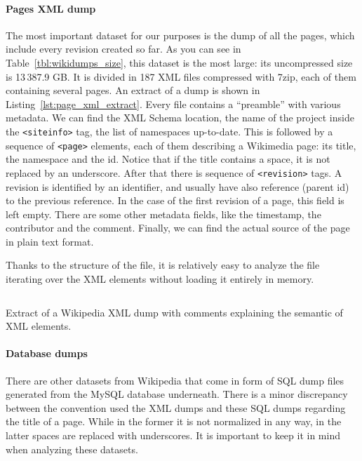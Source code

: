 \paragraph{Pages XML dump}
The most important dataset for our purposes is the dump of all the pages, which include every revision created so far.
As you can see in Table~\ref{tbl:wikidumps_size}, this dataset is the most large: its uncompressed size is 13\,387.9 GB\@.
It is divided in 187 XML files compressed with 7zip, each of them containing several pages.
An extract of a dump is shown in Listing~\ref{lst:page_xml_extract}.
Every file contains a ``preamble'' with various metadata.
We can find the XML Schema location, the name of the project inside the \texttt{<siteinfo>} tag, the list of namespaces up-to-date.
This is followed by a sequence of \texttt{<page>} elements, each of them describing a Wikimedia page: its title, the namespace and the id.
Notice that if the title contains a space, it is not replaced by an underscore.
After that there is sequence of \texttt{<revision>} tags.
A revision is identified by an identifier, and usually have also reference (parent id) to the previous reference.
In the case of the first revision of a page, this field is left empty.
There are some other metadata fields, like the timestamp, the contributor and the comment.
Finally, we can find the actual source of the page in plain text format.

Thanks to the structure of the file, it is relatively easy to analyze the file iterating over the XML elements without loading it entirely in memory.

\begin{listing}[t]
    \inputminted[breaklines=true]{xml}{assets/page_xml_extract.xml}
    \caption{Extract of a Wikipedia XML dump with comments explaining the semantic of XML elements.}
    \label{lst:page_xml_extract}
\end{listing}

\paragraph{Database dumps}
There are other datasets from Wikipedia that come in form of SQL dump files generated from the MySQL database underneath.
There is a minor discrepancy between the convention used the XML dumps and these SQL dumps regarding the title of a page.
While in the former it is not normalized in any way, in the latter spaces are replaced with underscores.
It is important to keep it in mind when analyzing these datasets.

